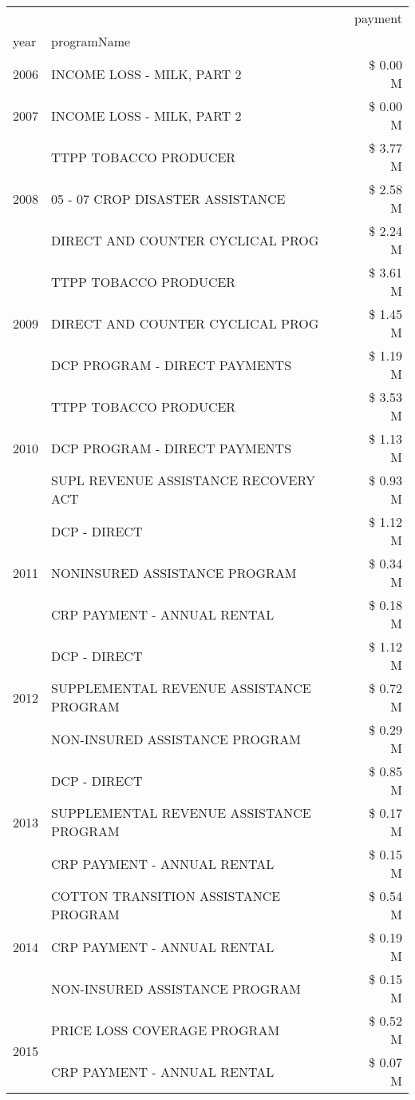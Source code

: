 \begin{tabular}{llr}
\toprule
 &  & payment \\
year & programName &  \\
\midrule
2006 & INCOME LOSS - MILK, PART 2 & \$ 0.00 M \\
\cline{1-3}
2007 & INCOME LOSS - MILK, PART 2 & \$ 0.00 M \\
\cline{1-3}
\multirow[t]{3}{*}{2008} & TTPP TOBACCO PRODUCER & \$ 3.77 M \\
 & 05 - 07 CROP DISASTER ASSISTANCE & \$ 2.58 M \\
 & DIRECT AND COUNTER CYCLICAL PROG & \$ 2.24 M \\
\cline{1-3}
\multirow[t]{3}{*}{2009} & TTPP TOBACCO PRODUCER & \$ 3.61 M \\
 & DIRECT AND COUNTER CYCLICAL PROG & \$ 1.45 M \\
 & DCP PROGRAM - DIRECT PAYMENTS & \$ 1.19 M \\
\cline{1-3}
\multirow[t]{3}{*}{2010} & TTPP TOBACCO PRODUCER & \$ 3.53 M \\
 & DCP PROGRAM - DIRECT PAYMENTS & \$ 1.13 M \\
 & SUPL REVENUE ASSISTANCE RECOVERY ACT & \$ 0.93 M \\
\cline{1-3}
\multirow[t]{3}{*}{2011} & DCP - DIRECT & \$ 1.12 M \\
 & NONINSURED ASSISTANCE PROGRAM & \$ 0.34 M \\
 & CRP PAYMENT - ANNUAL RENTAL & \$ 0.18 M \\
\cline{1-3}
\multirow[t]{3}{*}{2012} & DCP - DIRECT & \$ 1.12 M \\
 & SUPPLEMENTAL REVENUE ASSISTANCE PROGRAM & \$ 0.72 M \\
 & NON-INSURED ASSISTANCE PROGRAM & \$ 0.29 M \\
\cline{1-3}
\multirow[t]{3}{*}{2013} & DCP - DIRECT & \$ 0.85 M \\
 & SUPPLEMENTAL REVENUE ASSISTANCE PROGRAM & \$ 0.17 M \\
 & CRP PAYMENT - ANNUAL RENTAL & \$ 0.15 M \\
\cline{1-3}
\multirow[t]{3}{*}{2014} & COTTON TRANSITION ASSISTANCE PROGRAM & \$ 0.54 M \\
 & CRP PAYMENT - ANNUAL RENTAL & \$ 0.19 M \\
 & NON-INSURED ASSISTANCE PROGRAM & \$ 0.15 M \\
\cline{1-3}
\multirow[t]{3}{*}{2015} & PRICE LOSS COVERAGE PROGRAM & \$ 0.52 M \\
 & CRP PAYMENT - ANNUAL RENTAL & \$ 0.07 M \\

\end{tabular}

